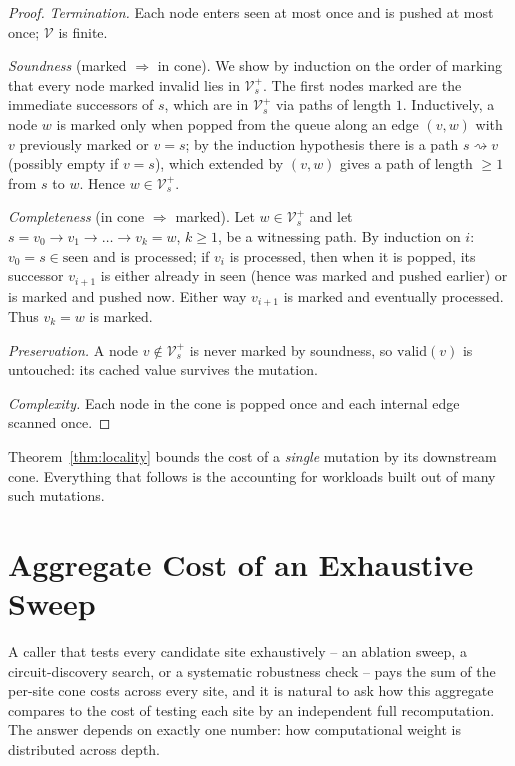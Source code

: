 \documentclass[11pt,a4paper]{article}
\newcommand{\V}{\mathcal{V}}
\begin{document}
\begin{proof}
\emph{Termination.} Each node enters $\mathrm{seen}$ at most once and is pushed at most once; $\V$ is finite.

\emph{Soundness} (marked $\Rightarrow$ in cone). We show by induction on the order of marking that every node marked invalid lies in $\V_s^{+}$. The first nodes marked are the immediate successors of $s$, which are in $\V_s^{+}$ via paths of length $1$. Inductively, a node $w$ is marked only when popped from the queue along an edge $(v, w)$ with $v$ previously marked or $v = s$; by the induction hypothesis there is a path $s \rightsquigarrow v$ (possibly empty if $v = s$), which extended by $(v,w)$ gives a path of length $\geq 1$ from $s$ to $w$. Hence $w \in \V_s^{+}$.

\emph{Completeness} (in cone $\Rightarrow$ marked). Let $w \in \V_s^{+}$ and let $s = v_0 \to v_1 \to \dots \to v_k = w$, $k \geq 1$, be a witnessing path. By induction on $i$: $v_0 = s \in \mathrm{seen}$ and is processed; if $v_i$ is processed, then when it is popped, its successor $v_{i+1}$ is either already in $\mathrm{seen}$ (hence was marked and pushed earlier) or is marked and pushed now. Either way $v_{i+1}$ is marked and eventually processed. Thus $v_k = w$ is marked.

\emph{Preservation.} A node $v \notin \V_s^{+}$ is never marked by soundness, so $\mathrm{valid}(v)$ is untouched: its cached value survives the mutation.

\emph{Complexity.} Each node in the cone is popped once and each internal edge scanned once.
\end{proof}

Theorem~\ref{thm:locality} bounds the cost of a \emph{single} mutation by its downstream cone. Everything that follows is the accounting for workloads built out of many such mutations.

\section{Aggregate Cost of an Exhaustive Sweep}
\label{sec:aggregate}

A caller that tests every candidate site exhaustively -- an ablation sweep, a circuit-discovery
search, or a systematic robustness check -- pays the sum of the per-site cone costs across
every site, and it is natural to ask how this aggregate compares to the cost of testing each site
by an independent full recomputation. The answer depends on exactly one number: how
computational weight is distributed across depth.
\end{document}
